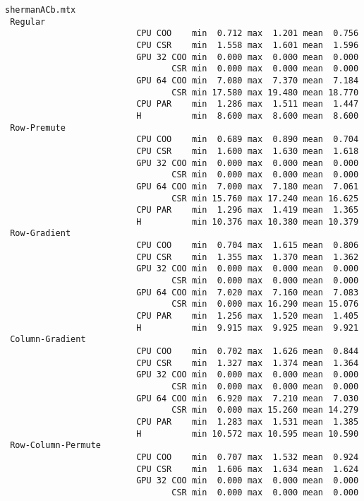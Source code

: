 \begin{verbatim}
shermanACb.mtx
 Regular
                          CPU COO    min  0.712 max  1.201 mean  0.756
                          CPU CSR    min  1.558 max  1.601 mean  1.596
                          GPU 32 COO min  0.000 max  0.000 mean  0.000
                                 CSR min  0.000 max  0.000 mean  0.000
                          GPU 64 COO min  7.080 max  7.370 mean  7.184
                                 CSR min 17.580 max 19.480 mean 18.770
                          CPU PAR    min  1.286 max  1.511 mean  1.447
                          H          min  8.600 max  8.600 mean  8.600
 Row-Premute
                          CPU COO    min  0.689 max  0.890 mean  0.704
                          CPU CSR    min  1.600 max  1.630 mean  1.618
                          GPU 32 COO min  0.000 max  0.000 mean  0.000
                                 CSR min  0.000 max  0.000 mean  0.000
                          GPU 64 COO min  7.000 max  7.180 mean  7.061
                                 CSR min 15.760 max 17.240 mean 16.625
                          CPU PAR    min  1.296 max  1.419 mean  1.365
                          H          min 10.376 max 10.380 mean 10.379
 Row-Gradient
                          CPU COO    min  0.704 max  1.615 mean  0.806
                          CPU CSR    min  1.355 max  1.370 mean  1.362
                          GPU 32 COO min  0.000 max  0.000 mean  0.000
                                 CSR min  0.000 max  0.000 mean  0.000
                          GPU 64 COO min  7.020 max  7.160 mean  7.083
                                 CSR min  0.000 max 16.290 mean 15.076
                          CPU PAR    min  1.256 max  1.520 mean  1.405
                          H          min  9.915 max  9.925 mean  9.921
 Column-Gradient
                          CPU COO    min  0.702 max  1.626 mean  0.844
                          CPU CSR    min  1.327 max  1.374 mean  1.364
                          GPU 32 COO min  0.000 max  0.000 mean  0.000
                                 CSR min  0.000 max  0.000 mean  0.000
                          GPU 64 COO min  6.920 max  7.210 mean  7.030
                                 CSR min  0.000 max 15.260 mean 14.279
                          CPU PAR    min  1.283 max  1.531 mean  1.385
                          H          min 10.572 max 10.595 mean 10.590
 Row-Column-Permute
                          CPU COO    min  0.707 max  1.532 mean  0.924
                          CPU CSR    min  1.606 max  1.634 mean  1.624
                          GPU 32 COO min  0.000 max  0.000 mean  0.000
                                 CSR min  0.000 max  0.000 mean  0.000

\end{verbatim}
